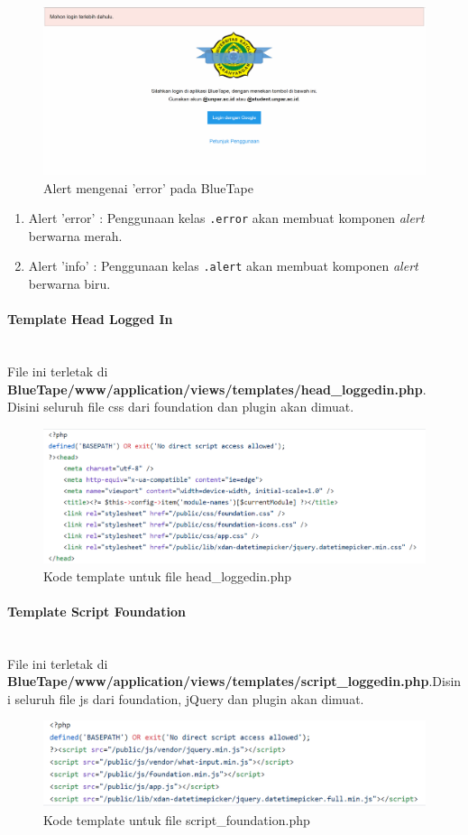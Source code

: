 \documentclass[a4paper,twoside]{article}
\newcommand{\myparagraph}[1]{\paragraph{#1}\mbox{}\\}
\begin{document}
\begin{enumerate}
		\begin{figure} [H]
			\centering  
			\includegraphics[scale=0.7]{alertError_zurb.png}  
			\caption{Alert mengenai 'error' pada BlueTape}	 
		\end{figure}
		\begin{enumerate}
			\item Alert 'error' : Penggunaan kelas \colorbox{mygray}{\texttt{.error}} akan membuat komponen \textit{alert} berwarna merah.
			\item Alert 'info' : Penggunaan kelas \colorbox{mygray}{\texttt{.alert}} akan membuat komponen \textit{alert} berwarna biru.
		\end{enumerate}
		
		\myparagraph{Template Head Logged In}
		File ini terletak di \textbf{BlueTape/www/application/views/templates/head\_loggedin.php}. Disini seluruh file css dari foundation dan plugin akan dimuat.
		
		\begin{figure} [H]
			\centering  
			\includegraphics[scale=0.7]{head_loggedin.png}  
			\caption{Kode template untuk file head\_loggedin.php} 
		\end{figure}
		
		\myparagraph{Template Script Foundation}
		File ini terletak di \textbf{BlueTape/www/application/views/templates/script\_loggedin.php}.Disini seluruh file js dari foundation, jQuery dan plugin akan dimuat.
		
		\begin{figure} [H]
			\centering  
			\includegraphics[scale=0.7]{script_foundation.png}  
			\caption{Kode template untuk file script_foundation.php} 
		\end{figure}

\end{enumerate}
\end{document}
